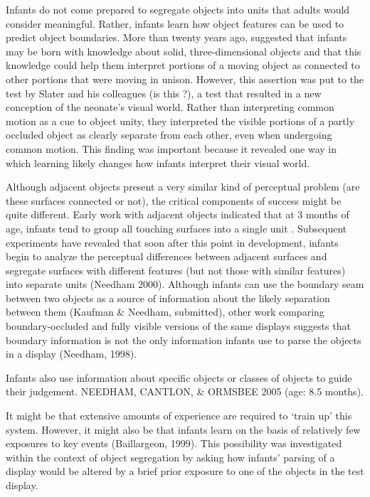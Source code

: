 Infants do not come prepared to segregate objects into units that
adults would consider meaningful.  Rather, infants learn how object
features can be used to predict object boundaries.  More than twenty
years ago,  suggested that infants may be born
with knowledge about solid, three-dimensional objects and that this
knowledge could help them interpret portions of a moving object as
connected to other portions that were moving in unison.  However, this
assertion was put to the test by Slater and his colleagues (is this
?), a test that resulted in a new conception of
the neonate's visual world.  Rather than interpreting common motion as
a cue to object unity, they interpreted the visible portions of a
partly occluded object as clearly separate from each other, even when
undergoing common motion.  This finding was important because it
revealed one way in which learning likely changes how infants
interpret their visual world.


Although adjacent objects present a very similar kind of perceptual
problem (are these surfaces connected or not), the critical components
of success might be quite different.  Early work with adjacent objects
indicated that at 3 months of age, infants tend to group all touching
surfaces into a single unit \cite{kestenbaum87perception}.
Subsequent experiments have revealed that soon after this point in
development, infants begin to analyze the perceptual differences
between adjacent surfaces and segregate surfaces with different
features (but not those with similar features) into separate units
(Needham 2000).  Although infants can use the boundary seam between
two objects as a source of information about the likely separation
between them (Kaufman \& Needham, submitted), other work comparing
boundary-occluded and fully visible versions of the same displays
suggests that boundary information is not the only information infants
use to parse the objects in a display (Needham, 1998).  

Infants also use information about specific objects or
classes of objects to guide their judgement.  
NEEDHAM, CANTLON, \& ORMSBEE 2005 (age: 8.5 months).


It might be that extensive amounts of experience are required to
`train up' this system.  However, it might also be that infants learn
on the basis of relatively few exposures to key events (Baillargeon,
1999).  This possibility was investigated within the context of object
segregation by asking how infants' parsing of a display would be
altered by a brief prior exposure to one of the objects in the test
display.



